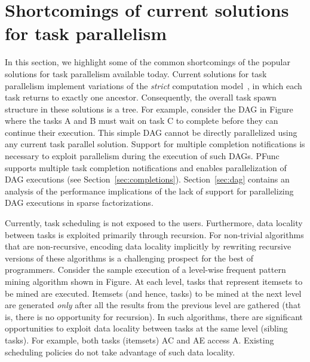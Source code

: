 \documentclass{sig-alternate}
\begin{document}
%
\section{Shortcomings of current solutions for task parallelism}
\label{sec:shortcomings}

In this section, we highlight some of the common shortcomings of the popular
solutions for task parallelism available today.  Current solutions for task
parallelism implement variations of the \textit{strict} computation
model~\cite{Blumofe94}, in which each task returns to exactly one ancestor.
Consequently, the overall task spawn structure in these solutions is a tree.
For example, consider the DAG in Figure where the tasks A and B
must wait on task C to complete before they can continue their execution. This
simple DAG cannot be directly parallelized using any current task parallel
solution.  Support for multiple completion notifications is necessary to
exploit parallelism during the execution of such DAGs.  PFunc supports multiple
task completion notifications and enables parallelization of DAG executions
(see Section~\ref{sec:completions}).  Section~\ref{sec:dag} contains an
analysis of the performance implications of the lack of support for
parallelizing DAG executions in sparse factorizations.

Currently, task scheduling is not exposed to the users. Furthermore, data
locality between tasks is exploited primarily through recursion.  For
non-trivial algorithms that are non-recursive, encoding data locality
implicitly by rewriting recursive versions 
of these algorithms is a challenging
prospect for the best of programmers.
%
Consider the sample execution of a level-wise frequent pattern mining algorithm
shown in Figure. At each level, tasks that represent itemsets to
be mined are executed. Itemsets (and hence, tasks) to be mined at the next
level are generated \textit{only} after all the results from the previous
level are gathered (that is, there is no opportunity for recursion). In such
algorithms, there are significant opportunities to exploit data locality
between tasks at the same level (sibling tasks). For example, both tasks
(itemsets) AC and AE access A.  Existing scheduling policies do not take
advantage of such data locality.
\end{document}
